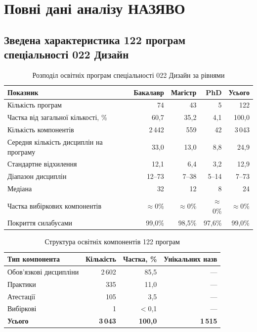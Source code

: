 \clearpage

\section{Повні дані аналізу НАЗЯВО}\label{app:naqa-data}

\subsection{Зведена характеристика 122 програм спеціальності 022 Дизайн}

\begin{table}[htbp]
\centering
\caption{Розподіл освітніх програм спеціальності 022 Дизайн за рівнями}\label{tab:app-naqa-levels}
\small
\begin{tabularx}{\textwidth}{@{}Xrrrr@{}}
\toprule
\textbf{Показник} & \textbf{Бакалавр} & \textbf{Магістр} & \textbf{PhD} & \textbf{Усього} \\
\midrule
Кількість програм & 74 & 43 & 5 & 122 \\
Частка від загальної кількості, \% & 60,7 & 35,2 & 4,1 & 100,0 \\
Кількість компонентів & 2\,442 & 559 & 42 & 3\,043 \\
Середня кількість дисциплін на програму & 33,0 & 13,0 & 8,8 & 24,9 \\
Стандартне відхилення & 12,1 & 6,4 & 3,2 & 12,9 \\
Діапазон дисциплін & 12--73 & 7--38 & 5--14 & 7--73 \\
Медіана & 32 & 12 & 8 & 24 \\
Частка вибіркових компонентів & $\approx$0\% & $\approx$0\% & $\approx$0\% & $\approx$0\% \\
Покриття силабусами & 99,0\% & 98,5\% & 97,6\% & 99,0\% \\
\bottomrule
\end{tabularx}
\end{table}

\begin{table}[htbp]
\centering
\caption{Структура освітніх компонентів 122 програм}\label{tab:app-naqa-components}
\small
\begin{tabularx}{\textwidth}{@{}Xrrr@{}}
\toprule
\textbf{Тип компонента} & \textbf{Кількість} & \textbf{Частка, \%} & \textbf{Унікальних назв} \\
\midrule
Обов'язкові дисципліни & 2\,602 & 85,5 & --- \\
Практики & 335 & 11,0 & --- \\
Атестації & 105 & 3,5 & --- \\
Вибіркові & 1 & $<$0,1 & --- \\
\addlinespace
\textbf{Усього} & \textbf{3\,043} & \textbf{100,0} & \textbf{1\,515} \\
\bottomrule
\end{tabularx}
\end{table}

